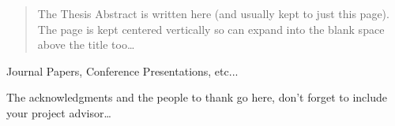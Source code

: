 \documentclass[
11pt, %
oneside, %
english, %
singlespacing, %
parskip, %
headsepline, %
]{MastersDoctoralThesis} %
\theoremstyle{definition}
\newcommand{\0}{{0_\TheCategoryOfSets}}
\newcommand{\1}{{1_\TheCategoryOfSets}}
\begin{document}


%
%


\begin{abstract}
\addchaptertocentry{\abstractname} %

The Thesis Abstract is written here (and usually kept to just this page). The page is kept centered vertically so can expand into the blank space above the title too\ldots

\end{abstract}


\begin{publications}
\addchaptertocentry{\publicationsname} %

Journal Papers, Conference Presentations, etc...

\end{publications}


\begin{acknowledgements}
\addchaptertocentry{\acknowledgementname} %

The acknowledgments and the people to thank go here, don't forget to include your project advisor\ldots

\end{acknowledgements}
\end{document}
